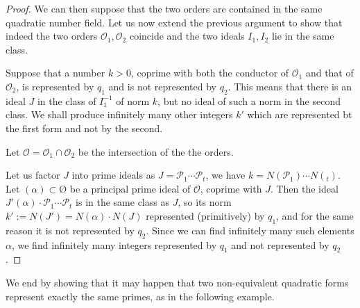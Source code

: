 \documentclass[leqno,12pt]{article} %
\theoremstyle{plain} %
\theoremstyle{definition} %
\begin{document}
\begin{proof}
We can then suppose that the two orders are contained in the same quadratic number field.
Let us now extend the previous argument to show that indeed the two orders $\mathcal{O}_1,\mathcal{O}_2$ coincide and the two ideals $I_1,I_2$ lie in the same class. 

Suppose that a number $k>0$, coprime with both the conductor of $\mathcal{O}_1$ and that of $\mathcal{O}_2$,  is represented by $q_1$ and is not represented by $q_2$. This means that there is an ideal $J$ in the class of $I_1^{-1}$ of norm $k$, but no ideal of such a norm  in the second class. We shall produce infinitely many other integers $k'$ which are represented bt the first form and not by the second.

Let $\mathcal{O}=\mathcal{O}_1\cap \mathcal{O}_2$ be the intersection of the the orders.


Let us factor $J$ into prime ideals as $J=\mathcal{P}_1\cdots \mathcal{P}_t$, we have $k=N(\mathcal{P}_1)\cdots N(\mathcal{}_t)$.  
Let $(\alpha)\subset\mathcal{Ø}$ be a principal prime ideal of $\mathcal{O}$, coprime with $J$.  Then the ideal $J'(\alpha)\cdot \mathcal{P}_1\cdots \mathcal{P}_t$ is in the same class as $J$, so its norm $k':=N(J')=N(\alpha)\cdot N(J)$ represented (primitively) by $q_1$, and for the same reason it is not represented by $q_2$. Since we can find infinitely many such elements $\alpha$, we find infinitely many integers represented by $q_1$ and not represented by $q_2$.
\smallskip


  
\end{proof}


 



We end by showing that it may happen that two non-equivalent quadratic forms represent exactly the same primes, as in the following example.
\end{document}
